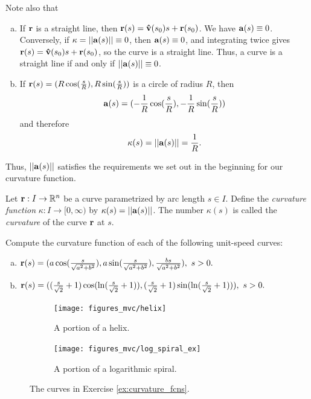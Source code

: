 \documentclass[12pt,letterpaper,reqno]{article}
\numberwithin{equation}{section}
\newcommand{\R}{\ensuremath{\mathbb R}}
\newcommand{\ba}{{\bf a}}
\newcommand{\bbr}{{\bf r}}
\begin{document}
{Note also that 

\begin{enumerate}[(a)]
	\item If $\bbr$ is a straight line, then $\bbr(s)={\bf \hat{v}}(s_0)s+\bbr(s_0)$. We have $\ba(s)\equiv 0$. Conversely, if $\kappa=||\ba(s)||\equiv 0$, then $\ba(s)\equiv 0$, and  integrating twice gives $\bbr(s)={\bf \hat{v}}(s_0)s+\bbr(s_0)$, so the curve is a straight line. Thus, a curve is a straight line if and only if $||\ba(s)||\equiv 0$.

\item If $\bbr(s)=(R\cos(\frac{s}{R}),R\sin(\frac{s}{R}))$ is a circle of radius $R$, then
\begin{align*}
	\ba(s)=(-\frac{1}{R}\cos(\frac{s}{R}),-\frac{1}{R}\sin(\frac{s}{R}))
\end{align*}
and therefore
\begin{align*}
	\kappa(s)=||\ba(s)||=\frac{1}{R}.
\end{align*}
\end{enumerate}	
Thus, $||\ba(s)||$ satisfies the requirements we set out in the beginning for our curvature function.

\begin{defn}[Curvature]\label{def:curvature}
	Let $\bbr:I \to \R^n$ be a curve parametrized by arc length $s \in I$. Define the \emph{curvature function} $\kappa:I \to [0,\infty)$ by $\kappa(s)=||\ba(s)||$. The number $\kappa(s)$ is called the \emph{curvature} of the curve $\bbr$ at $s$.
	\end{defn}
	
\begin{exercise}\label{ex:curvature_fcns}
Compute the curvature function of each of the following unit-speed curves:
\begin{enumerate}[(a)]
	\item $\bbr(s)=(a \cos(\frac{s}{\sqrt{a^2+b^2}}),a \sin(\frac{s}{\sqrt{a^2+b^2}}),\frac{bs}{\sqrt{a^2+b^2}}), \ s>0.$
	\item $\bbr(s)=((\frac{s}{\sqrt{2}}+1)\cos(\ln(\frac{s}{\sqrt{2}}+1)),(\frac{s}{\sqrt{2}}+1)\sin(\ln(\frac{s}{\sqrt{2}}+1))), \ s>0.$
\end{enumerate}	
\end{exercise}

\begin{figure}[h]
\centering
\begin{subfigure}{.5\textwidth}
  \centering
  \texttt{[image: figures\_mvc/helix]}
  \caption{A portion of a helix.}
  \label{fig:sub1}
\end{subfigure}%
\begin{subfigure}{.5\textwidth}
  \centering
  \texttt{[image: figures\_mvc/log\_spiral\_ex]}
  \caption{A portion of a logarithmic spiral.}
  \label{fig:sub2}
\end{subfigure}
\caption{The curves in Exercise \ref{ex:curvature_fcns}.}
\label{fig:test}
\end{figure}

}
\end{document}
